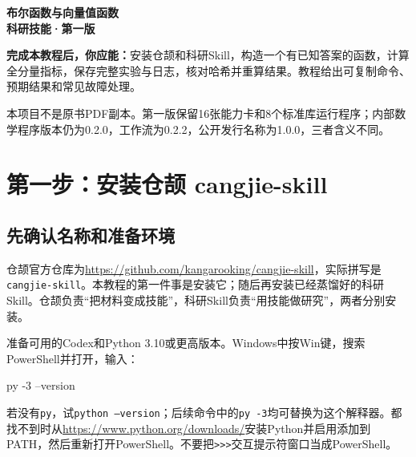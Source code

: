\documentclass[UTF8,fontset=fandol,zihao=-4]{ctexrep}
\begin{document}
\begin{titlepage}\centering\vspace*{18mm}
{\Huge\bfseries\color{ink}布尔函数与向量值函数\\科研技能·第一版\par}
\vspace{12mm}{\LARGE Codex 安装与使用教程\par}
\vspace{8mm}{\Large 从安装仓颉到科研复现\par}
\vspace{14mm}{\large 公开版本：V1 / 1.0.0\\冻结开发基线：0.2.2\\2026年10月27日\par}
\vfill\begin{minipage}{0.86\textwidth}
\textbf{完成本教程后，你应能：}安装仓颉和科研Skill，构造一个有已知答案的函数，计算全分量指标，保存完整实验与日志，核对哈希并重算结果。教程给出可复制命令、预期结果和常见故障处理。

本项目不是原书PDF副本。第一版保留16张能力卡和8个标准库运行程序；内部数学程序版本仍为0.2.0，工作流为0.2.2，公开发行名称为1.0.0，三者含义不同。
\end{minipage}\vspace*{10mm}
\end{titlepage}
\tableofcontents\clearpage

\chapter{第一步：安装仓颉 cangjie-skill}
\section{先确认名称和准备环境}
仓颉官方仓库为\url{https://github.com/kangarooking/cangjie-skill}，实际拼写是\texttt{cangjie-skill}。本教程的第一件事是安装它；随后再安装已经蒸馏好的科研Skill。仓颉负责“把材料变成技能”，科研Skill负责“用技能做研究”，两者分别安装。

准备可用的Codex和Python 3.10或更高版本。Windows中按Win键，搜索PowerShell并打开，输入：
\begin{code}
py -3 --version
\end{code}
若没有\texttt{py}，试\texttt{python --version}；后续命令中的\texttt{py -3}均可替换为这个解释器。都找不到时从\url{https://www.python.org/downloads/}安装Python并启用添加到PATH，然后重新打开PowerShell。不要把\texttt{>>>}交互提示符窗口当成PowerShell。
\end{document}
